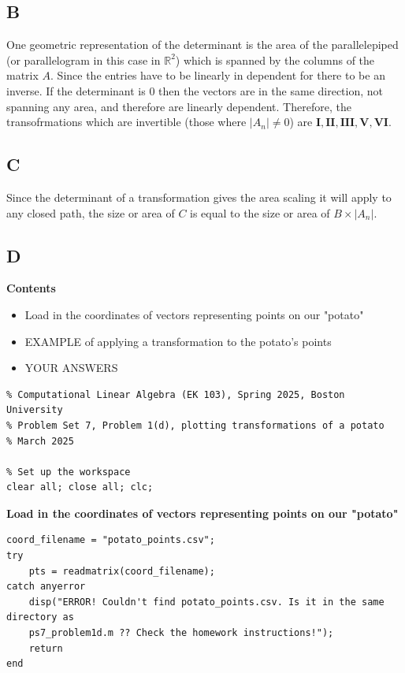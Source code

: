 \documentclass{article}
\begin{document}
\subsection*{B}

One geometric representation of the determinant is the area of the parallelepiped (or parallelogram in this case in \(\mathbb{R}^2\)) which is spanned by the columns of the matrix \(A\). Since the entries have to be linearly in dependent for there to be an inverse. If the determinant is \(0\) then the vectors are in the same direction, not spanning any area, and therefore are linearly dependent. Therefore, the transofrmations which are invertible (those where \(|A_n| \neq 0\)) are \(\mathbf{I, II, III, V, VI}\).

\subsection*{C}

Since the determinant of a transformation gives the area scaling it will apply to any closed path, the size or area of \(C\) is equal to the size or area of \(B \times |A_n|\).

\subsection*{D}



\textbf{Contents}

\begin{itemize}
	\setlength{\itemsep}{-1ex}
	\item Load in the coordinates of vectors representing points on our "potato"
	\item EXAMPLE of applying a transformation to the potato's points
	\item YOUR ANSWERS
\end{itemize}
\begin{verbatim}
% Computational Linear Algebra (EK 103), Spring 2025, Boston University
% Problem Set 7, Problem 1(d), plotting transformations of a potato
% March 2025

% Set up the workspace
clear all; close all; clc;
\end{verbatim}


\textbf{Load in the coordinates of vectors representing points on our "potato"}

\begin{verbatim}
coord_filename = "potato_points.csv";
try
    pts = readmatrix(coord_filename);
catch anyerror
    disp("ERROR! Couldn't find potato_points.csv. Is it in the same directory as 
    ps7_problem1d.m ?? Check the homework instructions!");
    return
end
\end{verbatim}
\end{document}
